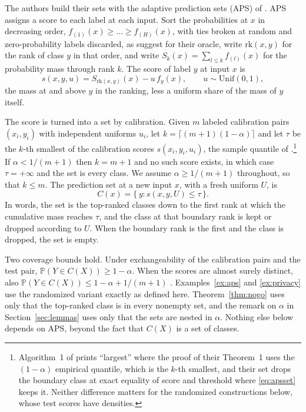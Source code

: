 \documentclass[11pt]{article}
\theoremstyle{definition}
\theoremstyle{definition}
\theoremstyle{remark}
\newcommand{\Prob}{\mathbb{P}}
\newcommand{\set}[1]{\{#1\}}
\begin{document}
The authors build their sets with the adaptive prediction sets (APS) of \citet{romano2020}. APS
assigns a score to each label at each input. Sort the probabilities at $x$ in decreasing order, $f_{(1)}(x) \ge \dots \ge f_{(H)}(x)$, with ties broken at random and zero-probability labels discarded, as \citet{romano2020} suggest for
their oracle, write $\mathrm{rk}(x, y)$ for the rank of class $y$ in that order, and
write $S_k(x) = \sum_{l \le k} f_{(l)}(x)$ for the probability mass through rank $k$. The score of
label $y$ at input $x$ is
\begin{equation}\label{eq:aps}
s(x, y, u) = S_{\mathrm{rk}(x,y)}(x) - u\, f_y(x), \qquad u \sim \mathrm{Unif}(0, 1),
\end{equation}
the mass at and above $y$ in the ranking, less a uniform share of the mass of $y$ itself.

The score is turned into a set by calibration. Given $m$ labeled calibration pairs $(x_i, y_i)$
with independent uniforms $u_i$, let $k = \lceil (m+1)(1-\alpha) \rceil$ and let $\tau$ be the $k$-th smallest of the calibration
scores $s(x_i, y_i, u_i)$, the sample quantile of \citet{lei2018}.\footnote{Algorithm~1 of
\citet{romano2020} prints ``largest'' where the proof of their Theorem~1 uses the $(1-\alpha)$
empirical quantile, which is the $k$-th smallest, and their set drops the boundary class at exact
equality of score and threshold where \eqref{eq:apsset} keeps it. Neither difference matters for the randomized constructions below, whose test scores have
densities.} If $\alpha < 1/(m+1)$ then $k = m+1$ and no such score exists,
in which case $\tau = +\infty$ and the set is every class. We
assume $\alpha \ge 1/(m+1)$ throughout, so that $k \le m$. The prediction set at a new input $x$,
with a fresh uniform $U$, is
\begin{equation}\label{eq:apsset}
C(x) = \set{\, y : s(x, y, U) \le \tau \,}.
\end{equation}
In words, the set is the top-ranked classes down to the first rank at which the cumulative mass
reaches $\tau$, and the class at that boundary rank is kept or dropped according to $U$. When the
boundary rank is the first and the class is dropped, the set is empty.

Two coverage bounds hold. Under exchangeability of the calibration pairs and the test pair,
$\Prob(Y \in C(X)) \ge 1 - \alpha$. When the scores are almost surely distinct, also
$\Prob(Y \in C(X)) \le 1 - \alpha + 1/(m+1)$ \citep[Theorem~1]{romano2020}. Examples~\ref{ex:aps} and \ref{ex:privacy} use the randomized variant exactly as defined here.
Theorem~\ref{thm:nogo} uses only that the top-ranked class is in every nonempty set, and the
remark on $\alpha$ in Section~\ref{sec:lemmas} uses only that the sets are nested in $\alpha$.
Nothing else below depends on APS, beyond the fact that $C(X)$ is a set of classes.
\end{document}

